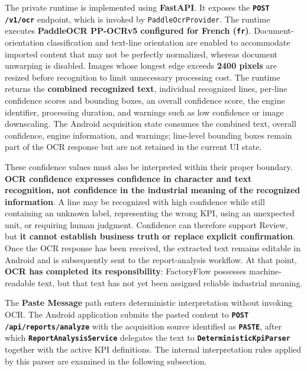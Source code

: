 The private runtime is implemented using \textbf{FastAPI}. It exposes the \textbf{\texttt{POST /v1/ocr}} endpoint, which is invoked by \texttt{PaddleOcrProvider}. The runtime executes \textbf{PaddleOCR PP-OCRv5 configured for French (\texttt{fr})}. Document-orientation classification and text-line orientation are enabled to accommodate imported content that may not be perfectly normalized, whereas document unwarping is disabled. Images whose longest edge exceeds \textbf{2400 pixels} are resized before recognition to limit unnecessary processing cost. The runtime returns the \textbf{combined recognized text}, individual recognized lines, per-line confidence scores and bounding boxes, an overall confidence score, the engine identifier, processing duration, and warnings such as low confidence or image downscaling. The Android acquisition state consumes the combined text, overall confidence, engine information, and warnings; line-level bounding boxes remain part of the OCR response but are not retained in the current UI state.

These confidence values must also be interpreted within their proper boundary. \textbf{OCR confidence expresses confidence in character and text recognition, not confidence in the industrial meaning of the recognized information}. A line may be recognized with high confidence while still containing an unknown label, representing the wrong KPI, using an unexpected unit, or requiring human judgment. Confidence can therefore support Review, but \textbf{it cannot establish business truth or replace explicit confirmation}. Once the OCR response has been received, the extracted text remains editable in Android and is subsequently sent to the report-analysis workflow. At that point, \textbf{OCR has completed its responsibility}: FactoryFlow possesses machine-readable text, but that text has not yet been assigned reliable industrial meaning.

The \textbf{Paste Message} path enters deterministic interpretation without invoking OCR. The Android application submits the pasted content to \textbf{\texttt{POST /api/reports/analyze}} with the acquisition source identified as \textbf{\texttt{PASTE}}, after which \textbf{\texttt{ReportAnalysisService}} delegates the text to \textbf{\texttt{DeterministicKpiParser}} together with the active KPI definitions. The internal interpretation rules applied by this parser are examined in the following subsection.

